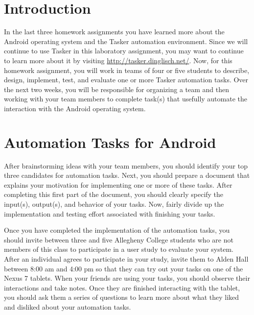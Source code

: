 

\usepackage[compact]{titlesec}



\section*{Introduction}

In the last three homework assignments you have learned more about the Android operating system and the Tasker
automation environment. Since we will continue to use Tasker in this laboratory assignment, you may want to continue to
learn more about it by visiting \url{http://tasker.dinglisch.net/}.  Now, for this homework assignment, you will work in
teams of four or five students to describe, design, implement, test, and evaluate one or more Tasker automation tasks.
Over the next two weeks, you will be responsible for organizing a team and then working with your team members to
complete task(s) that usefully automate the interaction with the Android operating system.

\section*{Automation Tasks for Android}

After brainstorming ideas with your team members, you should identify your top three candidates for automation tasks.
Next, you should prepare a document that explains your motivation for implementing one or more of these tasks.  After
completing this first part of the document, you should clearly specify the input(s), output(s), and behavior of your
tasks. Now, fairly divide up the implementation and testing effort associated with finishing your tasks. 

Once you have completed the implementation of the automation tasks, you should invite between three and five Allegheny
College students who are not members of this class to participate in a user study to evaluate your system.  After an
individual agrees to participate in your study, invite them to Alden Hall between 8:00 am and 4:00 pm so that they can
try out your tasks on one of the Nexus 7 tablets. When your friends are using your tasks, you should observe their
interactions and take notes.  Once they are finished interacting with the tablet, you should ask them a series of
questions to learn more about what they liked and disliked about your automation tasks.  

